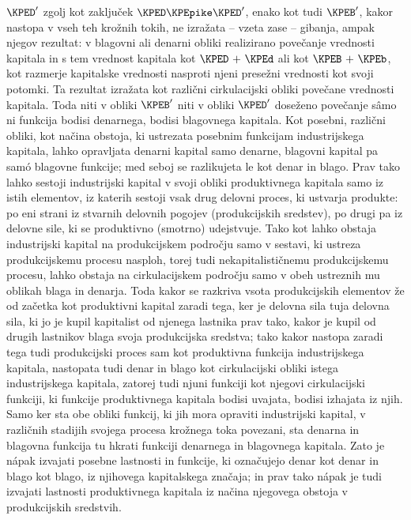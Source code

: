 \documentclass[kapital_02.tex]{subfiles}
\begin{document}
\( \KPED' \) zgolj kot zaključek \( \KPED \KPEpike \KPED' \), enako kot tudi \( \KPEB' \), kakor nastopa v vseh teh krožnih tokih, ne izražata -- vzeta zase -- gibanja, ampak njegov rezultat: v blagovni ali denarni obliki realizirano povečanje vrednosti kapitala in s tem vrednost kapitala kot \( \KPED \textrm{ + } \KPEd \) ali kot \( \KPEB \textrm{ + } \KPEb \), kot razmerje kapitalske vrednosti nasproti njeni presežni vrednosti kot svoji potomki. Ta rezultat izražata kot različni cirkulacijski obliki povečane vrednosti kapitala. Toda niti v obliki \( \KPEB' \) niti v obliki \KPEstran \( \KPED' \) doseženo povečanje s\^amo ni funkcija bodisi denarnega, bodisi blagovnega kapitala. Kot posebni, različni obliki, kot načina obstoja, ki ustrezata posebnim funkcijam industrijskega kapitala, lahko opravljata denarni kapital samo denarne, blagovni kapital pa sam\'o blagovne funkcije; med seboj se razlikujeta le kot denar in blago. Prav tako lahko sestoji industrijski kapital v svoji obliki produktivnega kapitala samo iz istih elementov, iz katerih sestoji vsak drug delovni proces, ki ustvarja produkte: po eni strani iz stvarnih delovnih pogojev (produkcijskih sredstev), po drugi pa iz delovne sile, ki se produktivno (smotrno) udejstvuje. Tako kot lahko obstaja industrijski kapital na produkcijskem področju samo v sestavi, ki ustreza produkcijskemu procesu nasploh, torej tudi nekapitalističnemu produkcijskemu procesu, lahko obstaja na cirkulacijskem področju samo v obeh ustreznih mu oblikah blaga in denarja. Toda kakor se razkriva vsota produkcijskih elementov že od začetka kot produktivni kapital zaradi tega, ker je delovna sila tuja delovna sila, ki jo je kupil kapitalist od njenega lastnika prav tako, kakor je kupil od drugih lastnikov blaga svoja produkcijska sredstva; tako kakor nastopa zaradi tega tudi produkcijski proces sam kot produktivna funkcija industrijskega kapitala, nastopata tudi denar in blago kot cirkulacijski obliki istega industrijskega kapitala, zatorej tudi njuni funkciji kot njegovi cirkulacijski funkciji, ki funkcije produktivnega kapitala bodisi uvajata, bodisi izhajata iz njih. Samo ker sta obe obliki funkcij, ki jih mora opraviti industrijski kapital, v različnih stadijih svojega procesa krožnega toka povezani, sta denarna in blagovna funkcija tu hkrati funkciji denarnega in blagovnega kapitala. Zato je n\'apak izvajati posebne lastnosti in funkcije, ki označujejo denar kot denar in blago kot blago, iz njihovega kapitalskega značaja; in prav tako n\'apak je tudi izvajati lastnosti produktivnega kapitala iz načina njegovega obstoja v produkcijskih sredstvih.
\end{document}
